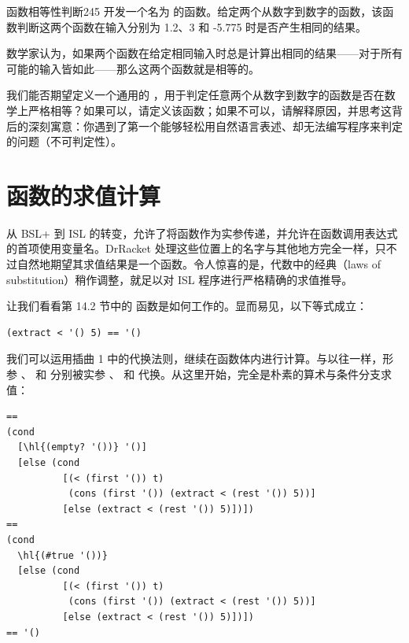 \begin{exercise}{函数相等性判断}{245}
开发一个名为  的函数。给定两个从数字到数字的函数，该函数判断这两个函数在输入分别为 1.2、3 和 -5.775 时是否产生相同的结果。

数学家认为，如果两个函数在给定相同输入时总是计算出相同的结果——对于所有可能的输入皆如此——那么这两个函数就是相等的。

我们能否期望定义一个通用的 ，用于判定任意两个从数字到数字的函数是否在数学上严格相等？如果可以，请定义该函数；如果不可以，请解释原因，并思考这背后的深刻寓意：你遇到了第一个能够轻松用自然语言表述、却无法编写程序来判定的问题（不可判定性）。
\end{exercise}

\section{函数的求值计算}
\label{sec:14_5}

从 BSL+ 到 ISL 的转变，允许了将函数作为实参传递，并允许在函数调用表达式的首项使用变量名。DrRacket 处理这些位置上的名字与其他地方完全一样，只不过自然地期望其求值结果是一个函数。令人惊喜的是，代数中的经典（laws of substitution）稍作调整，就足以对 ISL 程序进行严格精确的求值推导。

让我们看看第 14.2 节中的  函数是如何工作的。显而易见，以下等式成立：

\begin{lstlisting}[language=BSL]
(extract < '() 5) == '()
\end{lstlisting}

我们可以运用插曲 1 中的代换法则，继续在函数体内进行计算。与以往一样，形参 、 和  分别被实参 \code{<}、 和  代换。从这里开始，完全是朴素的算术与条件分支求值：

\begin{stepperbox}
\begin{Verbatim}[commandchars=\\\{\}, fontsize=\scriptsize]
==
(cond
  [\hl{(empty? '())} '()]
  [else (cond
          [(< (first '()) t)
           (cons (first '()) (extract < (rest '()) 5))]
          [else (extract < (rest '()) 5)])])
==
(cond
  \hl{(#true '())}
  [else (cond
          [(< (first '()) t)
           (cons (first '()) (extract < (rest '()) 5))]
          [else (extract < (rest '()) 5)])])
== '()
\end{Verbatim}
\end{stepperbox}

